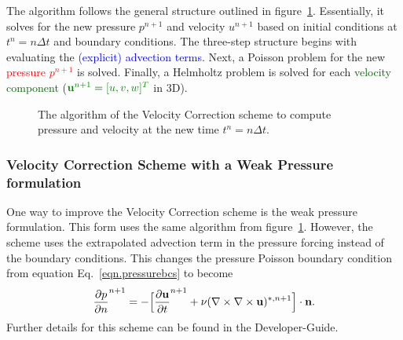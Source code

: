 The algorithm follows the general structure outlined in figure~\ref{fig.VCSAlgorithm}.
Essentially, it solves for the new pressure $p^{n+1}$ and velocity $u^{n+1}$ 
based on initial conditions at $t^n = n \Delta t$ and boundary conditions. 
The three-step structure begins with evaluating the \textcolor{blue}{(explicit) advection terms}.
Next, a Poisson problem for the new \textcolor{red}{pressure $p^{n+1}$} is solved.
Finally, a Helmholtz problem is solved for each 
\textcolor{darkgreen}{velocity component} ($\textcolor{darkgreen}{\mathbf{u}^{n+1}=[u,v,w]^T}$ in 3D).

\begin{figure}[!htbp]
\centering
{}
\label{fig.VCSAlgorithm}
\caption{The algorithm of the Velocity Correction scheme to 
compute pressure and velocity at the new time $t^n = n \Delta t$.}
\end{figure}


\subsubsection{Velocity Correction Scheme with a Weak Pressure formulation}
\label{VCSWeakScheme}

One way to improve the Velocity Correction scheme is the weak pressure formulation.
This form uses the same algorithm from figure~\ref{fig.VCSAlgorithm}.
However, the scheme uses the extrapolated advection term in the pressure forcing instead
of the boundary conditions.
This changes the pressure Poisson boundary condition 
from equation Eq.~\eqref{eqn.pressurebcs} to become
\begin{equation}
  \frac{\partial p}{\partial n}^{n+1}= - \Bigl[ \frac{\partial \mathbf{u}}{\partial t}^{n+1} + \nu (\nabla \times \nabla \times \mathbf{u})^{*,n+1}\Bigr]\cdot \mathbf{n}.
  \label{eqn.pressurebcsWeak}
\end{equation}
Further details for this scheme can be found in the Developer-Guide.

